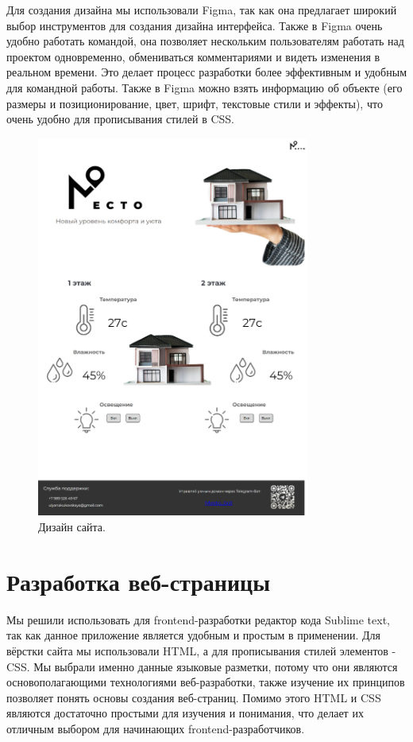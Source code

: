 Для создания дизайна мы использовали Figma, так как она  предлагает широкий выбор инструментов для создания дизайна интерфейса. Также в Figma очень удобно работать командой, она позволяет нескольким пользователям работать над проектом одновременно, обмениваться комментариями и видеть изменения в реальном времени. Это делает процесс разработки более эффективным и удобным для командной работы. Также в Figma можно взять информацию об объекте (его размеры и позиционирование, цвет, шрифт, текстовые стили и эффекты), что очень удобно для прописывания стилей в CSS.

\begin{figure}[h!]
	\centering
	\label{fig:img30}
	\includegraphics[width=0.8\textwidth]{./graphics/img/image30.png}
	\caption{Дизайн сайта.}
\end{figure}

\section{Разработка веб-страницы}

Мы решили использовать для frontend-разработки редактор кода Sublime text, так как данное приложение является удобным и простым в применении. Для вёрстки сайта мы использовали HTML, а для прописывания стилей элементов - CSS. Мы выбрали именно данные языковые разметки, потому что они являются основополагающими технологиями веб-разработки, также изучение их принципов позволяет понять основы создания веб-страниц. Помимо этого HTML и CSS являются достаточно простыми для изучения и понимания, что делает их отличным выбором для начинающих frontend-разработчиков. 


